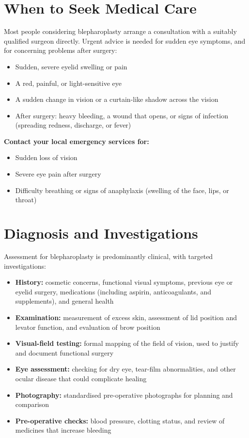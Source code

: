 \section*{When to Seek Medical Care}
Most people considering blepharoplasty arrange a consultation with a suitably qualified surgeon directly. Urgent advice is needed for sudden eye symptoms, and for concerning problems after surgery:

\begin{itemize}
    \item Sudden, severe eyelid swelling or pain
    \item A red, painful, or light-sensitive eye
    \item A sudden change in vision or a curtain-like shadow across the vision
    \item After surgery: heavy bleeding, a wound that opens, or signs of infection (spreading redness, discharge, or fever)
\end{itemize}

\textbf{Contact your local emergency services for:}
\begin{itemize}
    \item Sudden loss of vision
    \item Severe eye pain after surgery
    \item Difficulty breathing or signs of anaphylaxis (swelling of the face, lips, or throat)
\end{itemize}

\section*{Diagnosis and Investigations}
Assessment for blepharoplasty is predominantly clinical, with targeted investigations:

\begin{itemize}
    \item \textbf{History:} cosmetic concerns, functional visual symptoms, previous eye or eyelid surgery, medications (including aspirin, anticoagulants, and supplements), and general health
    \item \textbf{Examination:} measurement of excess skin, assessment of lid position and levator function, and evaluation of brow position
    \item \textbf{Visual-field testing:} formal mapping of the field of vision, used to justify and document functional surgery
    \item \textbf{Eye assessment:} checking for dry eye, tear-film abnormalities, and other ocular disease that could complicate healing
    \item \textbf{Photography:} standardised pre-operative photographs for planning and comparison
    \item \textbf{Pre-operative checks:} blood pressure, clotting status, and review of medicines that increase bleeding
\end{itemize}

